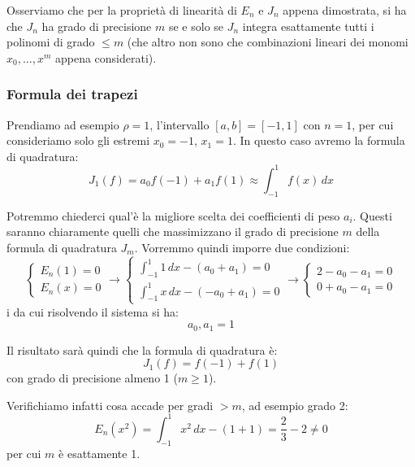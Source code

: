 \documentclass[a4paper,11pt]{article}
\begin{document}
Osserviamo che per la proprietà di linearità di $E_n$ e $J_n$ appena dimostrata, si ha che $J_n$ ha grado di precisione $m$ se e solo se $J_n$ integra esattamente tutti i polinomi di grado $\leq m$ (che altro non sono che combinazioni lineari dei monomi $x_0, ..., x^{m}$ appena considerati).

\subsubsection{Formula dei trapezi}

Prendiamo ad esempio $\rho = 1$, l'intervallo $[a, b] = [-1, 1]$ con $n = 1$, per cui consideriamo solo gli estremi $x_0 = -1$, $x_1 = 1$.
In questo caso avremo la formula di quadratura:
$$
J_1 (f) = a_0 f(-1) + a_1 f(1) \approx \int_{-1}^{1} f(x) \, dx
$$

Potremmo chiederci qual'è la migliore scelta dei coefficienti di peso $a_i$.
Questi saranno chiaramente quelli che massimizzano il grado di precisione $m$ della formula di quadratura $J_m$.
Vorremmo quindi imporre due condizioni:
$$
	\begin{cases}
		E_n(1) = 0 \\
		E_n(x) = 0
	\end{cases}
	\rightarrow
	\begin{cases}
		\int_{-1}^1 1 \, dx - (a_0 + a_1) = 0 \\
		\int_{-1}^1 x \, dx - (-a_0 + a_1) = 0
	\end{cases}
	\rightarrow
	\begin{cases}
		2 - a_0 - a_1 = 0 \\
		0 + a_0 - a_1 = 0
	\end{cases}
$$i
da cui risolvendo il sistema si ha:
$$a_0, a_1 = 1$$

Il risultato sarà quindi che la formula di quadratura è:
$$
J_1 (f) = f(-1) + f(1)
$$
con grado di precisione almeno 1 ($m \geq 1$).

Verifichiamo infatti cosa accade per gradi $> m$, ad esempio grado 2:
$$
E_n(x^2) = \int_{-1}^1 x^2 \, dx - (1 + 1) = \frac{2}{3} - 2 \neq 0
$$
per cui $m$ è esattamente 1.
\end{document}
